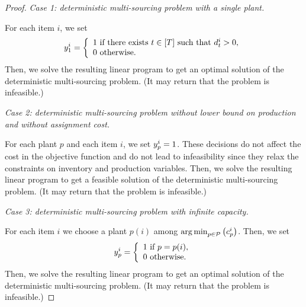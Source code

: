 \begin{proof}
\emph{Case 1: deterministic multi-sourcing problem with a single plant.}


For each item $i$, we set
$$
\open_1^i=
\left\{
\begin{array}{l}
1\mbox{ if there exists }t\in\range{\horizon}\mbox{ such that }\demand_t^i>0,\\
0\mbox{ otherwise}.
\end{array}
\right.
$$
Then, we solve the resulting linear program to get an optimal solution of the deterministic multi-sourcing problem.
(It may return that the problem is infeasible.)


\medskip


\emph{Case 2: deterministic multi-sourcing problem without lower bound on production and without assignment cost.}


For each plant $p$ and each item $i$, we set $y_p^i=1$.
These decisions do not affect the cost in the objective function and do not lead to infeasibility since they relax the constraints on inventory and production variables.
Then, we solve the resulting linear program to get a feasible solution of the deterministic multi-sourcing problem.
(It may return that the problem is infeasible.)


\medskip


\emph{Case 3: deterministic multi-sourcing problem with infinite capacity.}


For each item $i$ we choose a plant $p(i)$ among $\argmin_{p\in\plants}\bracket{\affect_p^i}$.
Then, we set
$$
\open_p^i=
\left\{
\begin{array}{l}
1\mbox{ if }p=p(i),\\
0\mbox{ otherwise}.
\end{array}
\right.
$$
Then, we solve the resulting linear program to get an optimal solution of the deterministic multi-sourcing problem.
(It may return that the problem is infeasible.)
\end{proof}


